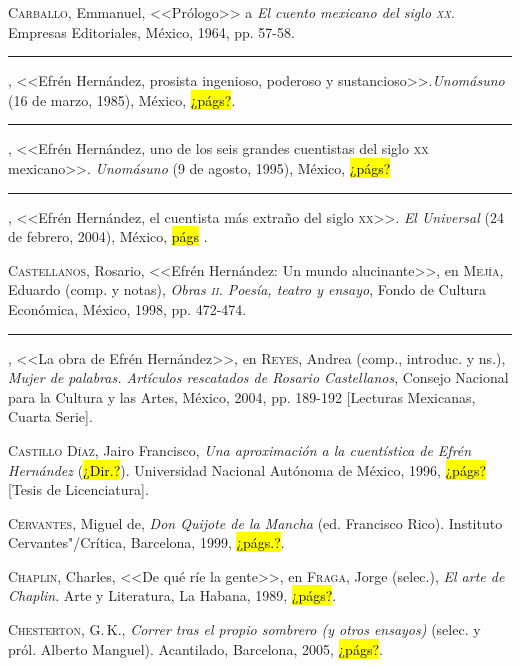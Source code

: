 \documentclass[14pt,twoside,final]{extbook} %
\begin{document}
\textsc{Carballo}, Emmanuel, <<Prólogo>> a \emph{El cuento mexicano del siglo \textsc{xx}}. Empresas Editoriales, México, 1964, pp. 57-58.\label{bib:carballo1964}

\rule{1cm}{0.4pt}, <<Efrén Hernández, prosista ingenioso, poderoso y sustancioso>>.\newline \emph{Unomásuno} (16 de marzo, 1985), México, \hl{¿págs?}.\label{bib:carballo1985}

\rule{1cm}{0.4pt}, <<Efrén Hernández, uno de los seis grandes cuentistas del siglo \textsc{xx} mexicano>>. \emph{Unomásuno} (9 de agosto, 1995), México, \hl{¿págs?}\label{bib:carballo1995}

\rule{1cm}{0.4pt}, <<Efrén Hernández, el cuentista más extraño del siglo \textsc{xx}>>. \emph{El Universal} (24 de febrero, 2004), México, \hl{págs} .\label{bib:carballo2004}

\textsc{Castellanos}, Rosario, <<Efrén Hernández: Un mundo alucinante>>, en \textsc{Mejía}, Eduardo (comp. y notas), \emph{Obras \textsc{ii}. Poesía, teatro y ensayo}, Fondo de Cultura Económica, México, 1998, pp. 472-474.\label{bib:castellanos1998}

\rule{1cm}{0.4pt}, <<La obra de Efrén Hernández>>, en \textsc{Reyes}, Andrea (comp., introduc. y ns.), \emph{Mujer de palabras. Artículos rescatados de Rosario Castellanos}, Consejo Nacional para la Cultura y las Artes, México, 2004, pp. \mbox{189-192} [Lecturas Mexicanas, Cuarta Serie].\label{bib:castellanos2004}

\textsc{Castillo Díaz}, Jairo Francisco, \emph{Una aproximación a la cuentística de Efrén Hernández} (\hl{¿Dir.?}). Universidad Nacional Autónoma de México, 1996, \hl{¿págs?} [Tesis de Licenciatura].\label{bib:castillo1996}

\textsc{Cervantes}, Miguel de, \emph{Don Quijote de la Mancha} (ed. Francisco Rico). Instituto Cervantes"/Crítica, Barcelona, 1999, \hl{¿págs.?}.\label{bib:cervantes1999}

\textsc{Chaplin}, Charles, <<De qué ríe la gente>>, en \textsc{Fraga}, Jorge (selec.), \emph{El arte de Chaplin}. Arte y Literatura, La Habana, 1989, \hl{¿págs?}.\label{bib:chaplin1989}

\textsc{Chesterton}, G.\,K., \emph{Correr tras el propio sombrero (y otros ensayos)} (selec. y pról. Alberto Manguel). Acantilado, Barcelona, 2005, \hl{¿págs?}.\label{bib:chesterton2005}
\end{document}
